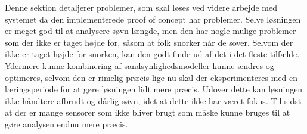 Denne sektion detaljerer problemer, som skal løses ved videre arbejde med systemet da den implementerede proof of concept har problemer. 
Selve løsningen er meget god til at analysere søvn længde, men den har nogle mulige problemer som der ikke er taget højde for, såsom at folk snorker når de sover.
Selvom der ikke er taget højde for snorken, kan den godt finde ud af det i det fleste tilfælde.
Ydermere kunne kombinering af sandsynlighedsmodeller kunne ændres og optimeres, selvom den er rimelig præcis lige nu skal der eksperimenteres med en læringsperiode for at gøre løsningen lidt mere præcis.
Udover dette kan løsningen ikke håndtere afbrudt og dårlig søvn, idet at dette ikke har været fokus.
Til sidst at der er mange sensorer som ikke bliver brugt som måske kunne bruges til at gøre analysen endnu mere præcis.